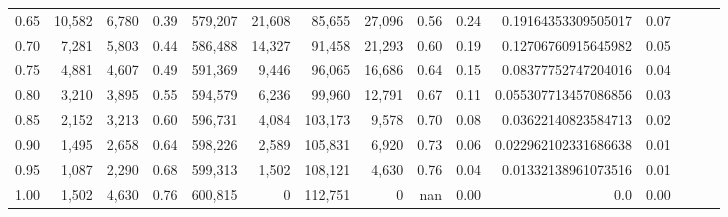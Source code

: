 \begin{tabular}{rrrrrrrrrrrrrrr}
0.65 &  10,582 &   6,780 &  0.39 &  579,207 &   21,608 &   85,655 &   27,096 &  0.56 &  0.24 &   0.19164353309505017 &      0.07 \\
0.70 &   7,281 &   5,803 &  0.44 &  586,488 &   14,327 &   91,458 &   21,293 &  0.60 &  0.19 &   0.12706760915645982 &      0.05 \\
0.75 &   4,881 &   4,607 &  0.49 &  591,369 &    9,446 &   96,065 &   16,686 &  0.64 &  0.15 &   0.08377752747204016 &      0.04 \\
0.80 &   3,210 &   3,895 &  0.55 &  594,579 &    6,236 &   99,960 &   12,791 &  0.67 &  0.11 &  0.055307713457086856 &      0.03 \\
0.85 &   2,152 &   3,213 &  0.60 &  596,731 &    4,084 &  103,173 &    9,578 &  0.70 &  0.08 &   0.03622140823584713 &      0.02 \\
0.90 &   1,495 &   2,658 &  0.64 &  598,226 &    2,589 &  105,831 &    6,920 &  0.73 &  0.06 &  0.022962102331686638 &      0.01 \\
0.95 &   1,087 &   2,290 &  0.68 &  599,313 &    1,502 &  108,121 &    4,630 &  0.76 &  0.04 &   0.01332138961073516 &      0.01 \\
1.00 &   1,502 &   4,630 &  0.76 &  600,815 &        0 &  112,751 &        0 &   nan &  0.00 &                   0.0 &      0.00 \\
\bottomrule
\end{tabular}
